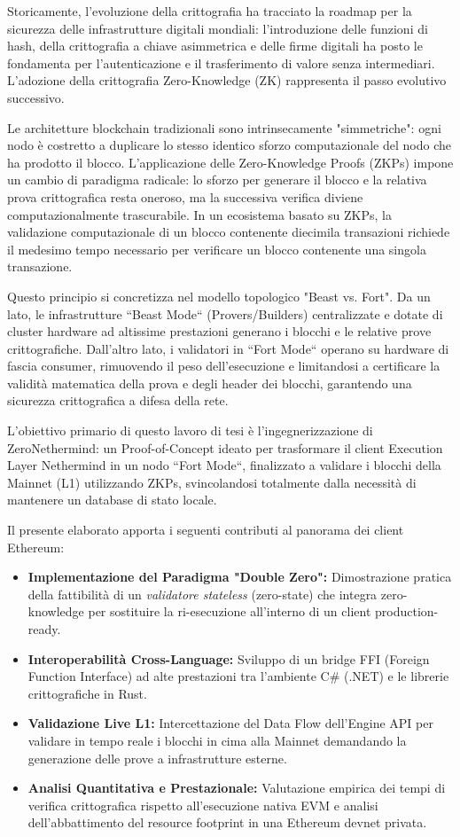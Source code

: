 \documentclass[12pt,a4paper,openright,twoside]{report}
\begin{document}
Storicamente, l'evoluzione della crittografia ha tracciato la roadmap per la sicurezza delle infrastrutture digitali mondiali: l'introduzione delle funzioni di hash, della crittografia a chiave asimmetrica e delle firme digitali ha posto le fondamenta per l'autenticazione e il trasferimento di valore senza intermediari. L'adozione della crittografia Zero-Knowledge (ZK) rappresenta il passo evolutivo successivo.

Le architetture blockchain tradizionali sono intrinsecamente "simmetriche": ogni nodo è costretto a duplicare lo stesso identico sforzo computazionale del nodo che ha prodotto il blocco. L'applicazione delle Zero-Knowledge Proofs (ZKPs) impone un cambio di paradigma radicale: lo sforzo per generare il blocco e la relativa prova crittografica resta oneroso, ma la successiva verifica diviene computazionalmente trascurabile. In un ecosistema basato su ZKPs, la validazione computazionale di un blocco contenente diecimila transazioni richiede il medesimo tempo necessario per verificare un blocco contenente una singola transazione.

Questo principio si concretizza nel modello topologico "Beast vs. Fort"\cite{lean_ethereum}. Da un lato, le infrastrutture ``Beast Mode`` (Provers/Builders) centralizzate e dotate di cluster hardware ad altissime prestazioni generano i blocchi e le relative prove crittografiche. Dall'altro lato, i validatori in ``Fort Mode`` operano su hardware di fascia consumer, rimuovendo il peso dell'esecuzione e limitandosi a certificare la validità matematica della prova e degli header dei blocchi, garantendo una sicurezza crittografica a difesa della rete.

L'obiettivo primario di questo lavoro di tesi è l'ingegnerizzazione di ZeroNethermind: un Proof-of-Concept ideato per trasformare il client Execution Layer Nethermind in un nodo ``Fort Mode``, finalizzato a validare i blocchi della Mainnet (L1) utilizzando ZKPs, svincolandosi totalmente dalla necessità di mantenere un database di stato locale.

Il presente elaborato apporta i seguenti contributi al panorama dei client Ethereum:
\begin{itemize}
    \item \textbf{Implementazione del Paradigma "Double Zero":} Dimostrazione pratica della fattibilità di un \textit{validatore stateless} (zero-state) che integra zero-knowledge per sostituire la ri-esecuzione all'interno di un client production-ready.
    \item \textbf{Interoperabilità Cross-Language:} Sviluppo di un bridge FFI (Foreign Function Interface) ad alte prestazioni tra l'ambiente C\# (.NET) e le librerie crittografiche in Rust.
    \item \textbf{Validazione Live L1:} Intercettazione del Data Flow dell'Engine API per validare in tempo reale i blocchi in cima alla Mainnet demandando la generazione delle prove a infrastrutture esterne.
    \item \textbf{Analisi Quantitativa e Prestazionale:} Valutazione empirica dei tempi di verifica crittografica rispetto all'esecuzione nativa EVM e analisi dell'abbattimento del resource footprint in una Ethereum devnet privata.
\end{itemize}
\end{document}
